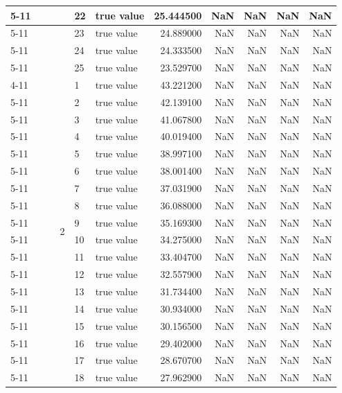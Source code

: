 \begin{tabular}{llllllrrrrr}
\cline{5-11}
 &  &  &  & 22 & true value & 25.444500 & NaN & NaN & NaN & NaN \\
\cline{5-11}
 &  &  &  & 23 & true value & 24.889000 & NaN & NaN & NaN & NaN \\
\cline{5-11}
 &  &  &  & 24 & true value & 24.333500 & NaN & NaN & NaN & NaN \\
\cline{5-11}
 &  &  &  & 25 & true value & 23.529700 & NaN & NaN & NaN & NaN \\
\cline{4-11} \cline{5-11}
 &  &  & \multirow[t]{25}{*}{2} & 1 & true value & 43.221200 & NaN & NaN & NaN & NaN \\
\cline{5-11}
 &  &  &  & 2 & true value & 42.139100 & NaN & NaN & NaN & NaN \\
\cline{5-11}
 &  &  &  & 3 & true value & 41.067800 & NaN & NaN & NaN & NaN \\
\cline{5-11}
 &  &  &  & 4 & true value & 40.019400 & NaN & NaN & NaN & NaN \\
\cline{5-11}
 &  &  &  & 5 & true value & 38.997100 & NaN & NaN & NaN & NaN \\
\cline{5-11}
 &  &  &  & 6 & true value & 38.001400 & NaN & NaN & NaN & NaN \\
\cline{5-11}
 &  &  &  & 7 & true value & 37.031900 & NaN & NaN & NaN & NaN \\
\cline{5-11}
 &  &  &  & 8 & true value & 36.088000 & NaN & NaN & NaN & NaN \\
\cline{5-11}
 &  &  &  & 9 & true value & 35.169300 & NaN & NaN & NaN & NaN \\
\cline{5-11}
 &  &  &  & 10 & true value & 34.275000 & NaN & NaN & NaN & NaN \\
\cline{5-11}
 &  &  &  & 11 & true value & 33.404700 & NaN & NaN & NaN & NaN \\
\cline{5-11}
 &  &  &  & 12 & true value & 32.557900 & NaN & NaN & NaN & NaN \\
\cline{5-11}
 &  &  &  & 13 & true value & 31.734400 & NaN & NaN & NaN & NaN \\
\cline{5-11}
 &  &  &  & 14 & true value & 30.934000 & NaN & NaN & NaN & NaN \\
\cline{5-11}
 &  &  &  & 15 & true value & 30.156500 & NaN & NaN & NaN & NaN \\
\cline{5-11}
 &  &  &  & 16 & true value & 29.402000 & NaN & NaN & NaN & NaN \\
\cline{5-11}
 &  &  &  & 17 & true value & 28.670700 & NaN & NaN & NaN & NaN \\
\cline{5-11}
 &  &  &  & 18 & true value & 27.962900 & NaN & NaN & NaN & NaN \\

\end{tabular}
